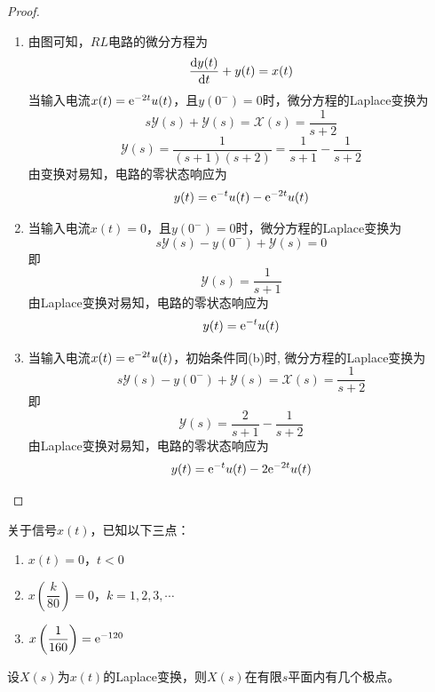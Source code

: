 \begin{proof}

    \begin{enumerate}

        \item 
            由图可知，$RL$电路的微分方程为
            $$\dfrac{\mathrm{d} y(t)}{\mathrm{d} t} + y(t) = x(t)$$
            当输入电流$x(t) = \mathrm{e}^{-2t}u(t)$，且$y(0^{-}) = 0$时，微分方程的\textup{Laplace}变换为
            $$s\mathscr{Y}(s) + \mathscr{Y}(s) = \mathscr{X}(s) = \dfrac{1}{s + 2}$$
            $$\mathscr{Y}(s) = \dfrac{1}{(s + 1)(s + 2)} = \dfrac{1}{s + 1} - \dfrac{1}{s + 2}$$
            由变换对易知，电路的零状态响应为
            $$y(t) = \mathrm{e}^{-t}u(t) - \mathrm{e}^{-2t}u(t)$$

        \item 
            当输入电流$x(t) = 0$，且$y(0^{-}) = 0$时，微分方程的\textup{Laplace}变换为
            $$s\mathscr{Y}(s) - y(0^{-}) + \mathscr{Y}(s) = 0$$
            即
            $$\mathscr{Y}(s) = \dfrac{1}{s + 1}$$
            由\textup{Laplace}变换对易知，电路的零状态响应为
            $$y(t) = \mathrm{e}^{-t}u(t)$$
        \item 
            当输入电流$x(t) =  \mathrm{e}^{-2t}u(t)$，初始条件同\textup{(b)}时,
            微分方程的\textup{Laplace}变换为
            $$s\mathscr{Y}(s) - y(0^{-}) + \mathscr{Y}(s) = \mathscr{X}(s) = \dfrac{1}{s + 2}$$
            即
            $$\mathscr{Y}(s) = \dfrac{2}{s + 1}  - \dfrac{1}{s + 2}$$
            由\textup{Laplace}变换对易知，电路的零状态响应为
            $$y(t) = \mathrm{e}^{-t}u(t) - 2\mathrm{e}^{-2t}u(t)$$
    \end{enumerate}

    
\end{proof}


\begin{proposition}
    
    关于信号$x(t)$，已知以下三点：
    
    \begin{enumerate}

        \item $x(t) = 0$，$t < 0$
        
        \item $x \left( \dfrac{k}{80} \right) = 0$，$k = 1, 2, 3, \cdots$
        
        \item $x \left( \dfrac{1}{160} \right) = \mathrm{e}^{-120}$
        
   \end{enumerate}

   设$X(s)$为$x(t)$的\textup{Laplace}变换，则$X(s)$在有限$s$平面内有几个极点。

\end{proposition}

